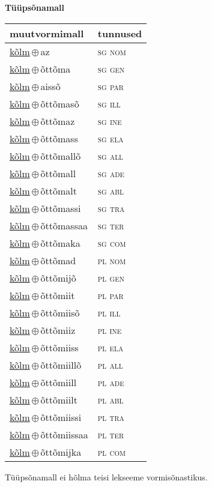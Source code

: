 

\vspace{3.5em}
\noindent \begin{minipage}{\textwidth}
\noindent \textbf{Tüüpsõnamall \,}\\

\begin{sideways}
\begin{tabular}{l l}
muutvormimall & tunnused \\
\hline
\underline{kõlm}\,$\oplus$\,az & \textsc{ sg nom } \\
\underline{kõlm}\,$\oplus$\,õttõma & \textsc{ sg gen } \\
\underline{kõlm}\,$\oplus$\,aissõ & \textsc{ sg par } \\
\underline{kõlm}\,$\oplus$\,õttõmasõ & \textsc{ sg ill } \\
\underline{kõlm}\,$\oplus$\,õttõmaz & \textsc{ sg ine } \\
\underline{kõlm}\,$\oplus$\,õttõmass & \textsc{ sg ela } \\
\underline{kõlm}\,$\oplus$\,õttõmallõ & \textsc{ sg all } \\
\underline{kõlm}\,$\oplus$\,õttõmall & \textsc{ sg ade } \\
\underline{kõlm}\,$\oplus$\,õttõmalt & \textsc{ sg abl } \\
\underline{kõlm}\,$\oplus$\,õttõmassi & \textsc{ sg tra } \\
\underline{kõlm}\,$\oplus$\,õttõmassaa & \textsc{ sg ter } \\
\underline{kõlm}\,$\oplus$\,õttõmaka & \textsc{ sg com } \\
\underline{kõlm}\,$\oplus$\,õttõmad & \textsc{ pl nom } \\
\underline{kõlm}\,$\oplus$\,õttõmijõ & \textsc{ pl gen } \\
\underline{kõlm}\,$\oplus$\,õttõmiit & \textsc{ pl par } \\
\underline{kõlm}\,$\oplus$\,õttõmiisõ & \textsc{ pl ill } \\
\underline{kõlm}\,$\oplus$\,õttõmiiz & \textsc{ pl ine } \\
\underline{kõlm}\,$\oplus$\,õttõmiiss & \textsc{ pl ela } \\
\underline{kõlm}\,$\oplus$\,õttõmiillõ & \textsc{ pl all } \\
\underline{kõlm}\,$\oplus$\,õttõmiill & \textsc{ pl ade } \\
\underline{kõlm}\,$\oplus$\,õttõmiilt & \textsc{ pl abl } \\
\underline{kõlm}\,$\oplus$\,õttõmiissi & \textsc{ pl tra } \\
\underline{kõlm}\,$\oplus$\,õttõmiissaa & \textsc{ pl ter } \\
\underline{kõlm}\,$\oplus$\,õttõmijka & \textsc{ pl com } \\
\end{tabular}
\end{sideways}
\label{tab:tüüpsõnamall-kõlmaz}

\end{minipage}

 
\vspace{1em}
\noindent Tüüpsõnamall  ei hõlma teisi lekseeme vormi\-sõnastikus.
